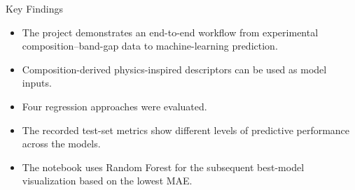 \documentclass[aspectratio=169,11pt]{beamer}
\begin{document}
\begin{frame}{Key Findings}
\begin{itemize}
  \item The project demonstrates an end-to-end workflow from experimental composition--band-gap data to machine-learning prediction.
  \item Composition-derived physics-inspired descriptors can be used as model inputs.
  \item Four regression approaches were evaluated.
  \item The recorded test-set metrics show different levels of predictive performance across the models.
  \item The notebook uses Random Forest for the subsequent best-model visualization based on the lowest MAE.
\end{itemize}
\end{frame}

\end{document}
